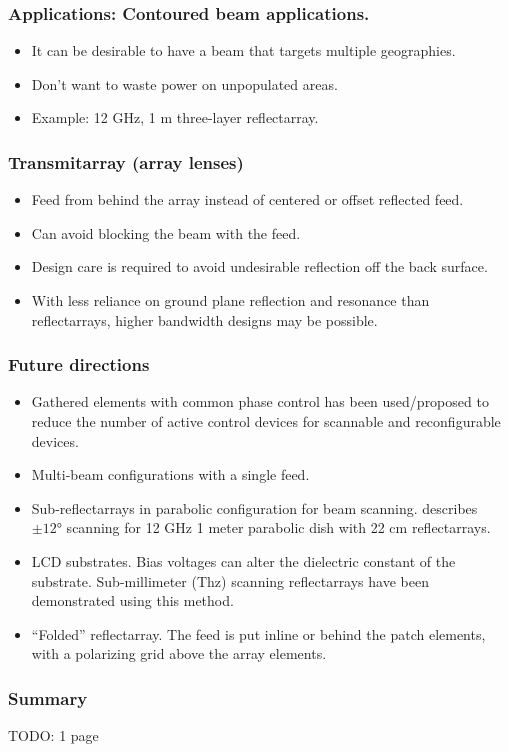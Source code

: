 \begin{frame}
\frametitle{Applications: Contoured beam applications.}

\begin{itemize}
\item It can be desirable to have a beam that targets multiple geographies.
\item Don't want to waste power on unpopulated areas.
\item Example: 12 \si{GHz}, 1 \si{m} three-layer reflectarray.
\end{itemize}

\end{frame}


\begin{frame}
\frametitle{Transmitarray (array lenses)}
\begin{itemize}
\item Feed from behind the array instead of centered or offset reflected feed.
\item Can avoid blocking the beam with the feed.
\item Design care is required to avoid undesirable reflection off the back surface.
\item With less reliance on ground plane reflection and resonance than reflectarrays, higher bandwidth designs may be possible.
\end{itemize}
\end{frame}

\begin{frame}[allowframebreaks]
\frametitle{Future directions}
\begin{itemize}
\item Gathered elements with common phase control has been used/proposed to reduce the number of active control devices for scannable and reconfigurable devices.  \citep{carrasco2012recent}
\item Multi-beam configurations with a single feed. \citep{carrasco2012recent}
\item Sub-reflectarrays in parabolic configuration for beam scanning.  \citep{arrebola2010phase} describes \( \pm \ang{12} \) scanning for 12 \si{GHz} 1 meter parabolic dish with 22 \si{cm} reflectarrays.
\item LCD substrates.  Bias voltages can alter the dielectric constant of the substrate.  Sub-millimeter (\si{Thz}) scanning reflectarrays have been demonstrated using this method.
\item ``Folded'' reflectarray.  The feed is put inline or behind the patch elements, with a polarizing grid above the array elements.
\end{itemize}
\end{frame}


\begin{frame}
\frametitle{Summary}

TODO: 1 page
\end{frame}
